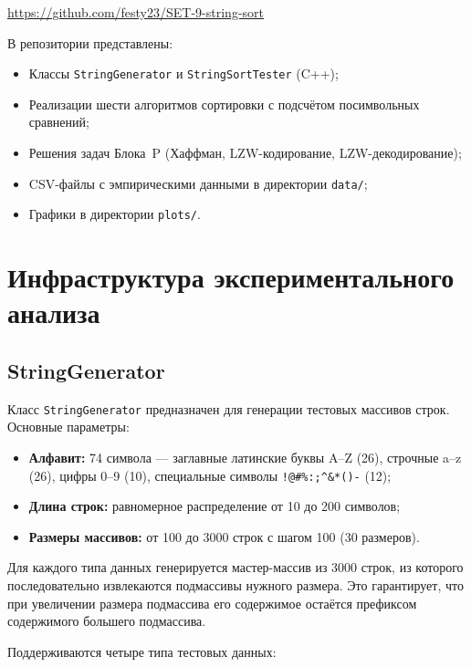\documentclass[12pt,a4paper]{article}
\begin{document}
\begin{center}
\url{https://github.com/festy23/SET-9-string-sort}
\end{center}

В репозитории представлены:
\begin{itemize}
    \item Классы \texttt{StringGenerator} и \texttt{StringSortTester} (C++);
    \item Реализации шести алгоритмов сортировки с подсчётом посимвольных сравнений;
    \item Решения задач Блока~P (Хаффман, LZW-кодирование, LZW-декодирование);
    \item CSV-файлы с эмпирическими данными в директории \texttt{data/};
    \item Графики в директории \texttt{plots/}.
\end{itemize}


\section{Инфраструктура экспериментального анализа}

\subsection{StringGenerator}

Класс \texttt{StringGenerator} предназначен для генерации тестовых массивов строк. Основные параметры:

\begin{itemize}
    \item \textbf{Алфавит:} 74 символа — заглавные латинские буквы A--Z (26), строчные a--z (26), цифры 0--9 (10), специальные символы \texttt{!@\#\%:;\^{}\&*()-} (12);
    \item \textbf{Длина строк:} равномерное распределение от 10 до 200 символов;
    \item \textbf{Размеры массивов:} от 100 до 3000 строк с шагом 100 (30 размеров).
\end{itemize}

Для каждого типа данных генерируется мастер-массив из 3000 строк, из которого последовательно извлекаются подмассивы нужного размера. Это гарантирует, что при увеличении размера подмассива его содержимое остаётся префиксом содержимого большего подмассива.

Поддерживаются четыре типа тестовых данных:
\end{document}
